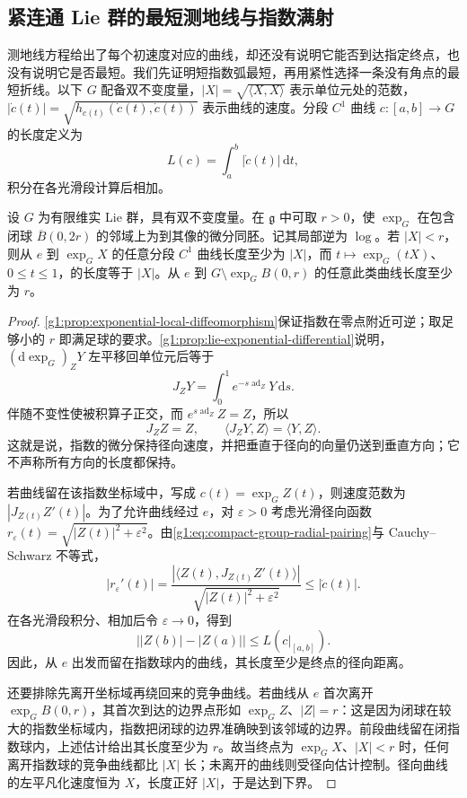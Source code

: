 \subsection{紧连通 Lie 群的最短测地线与指数满射}
\label{g1:subsec:1901:04}
测地线方程给出了每个初速度对应的曲线，却还没有说明它能否到达指定终点，也没有说明它是否最短。我们先证明短指数弧最短，再用紧性选择一条没有角点的最短折线。以下 \(G\) 配备双不变度量，\(|X|=\sqrt{\langle X,X\rangle}\) 表示单位元处的范数，\(|\dot c(t)|=\sqrt{h_{c(t)}(\dot c(t),\dot c(t))}\) 表示曲线的速度。分段 \(C^1\) 曲线 \(c:[a,b]\to G\) 的长度定义为
\[
	L(c)=\int_a^b|\dot c(t)|\,\mathrm{d}t,
\]
积分在各光滑段计算后相加。

\begin{lemma}\label{g1:lem:compact-group-radial-estimate}
	设 \(G\) 为有限维实 Lie 群，具有双不变度量。在 \(\mathfrak g\) 中可取 \(r>0\)，使 \(\exp_G\) 在包含闭球 \(\overline B(0,2r)\) 的邻域上为到其像的微分同胚。记其局部逆为 \(\log\)。若 \(|X|<r\)，则从 \(e\) 到 \(\exp_GX\) 的任意分段 \(C^1\) 曲线长度至少为 \(|X|\)，而 \(t\mapsto\exp_G(tX)\)、\(0\le t\le1\)，的长度等于 \(|X|\)。从 \(e\) 到 \(G\setminus\exp_GB(0,r)\) 的任意此类曲线长度至少为 \(r\)。
\end{lemma}
\begin{proof}
	\cref{g1:prop:exponential-local-diffeomorphism}保证指数在零点附近可逆；取足够小的 \(r\) 即满足球的要求。\cref{g1:prop:lie-exponential-differential}说明，\((\mathrm{d}\exp_G)_ZY\) 左平移回单位元后等于
	\[
		J_ZY=\int_0^1e^{-s\operatorname{ad}_Z}Y\,\mathrm{d}s.
	\]
	伴随不变性使被积算子正交，而 \(e^{s\operatorname{ad}_Z}Z=Z\)，所以
	\begin{equation}\label{g1:eq:compact-group-radial-pairing}
		J_ZZ=Z,\qquad \langle J_ZY,Z\rangle=\langle Y,Z\rangle.
	\end{equation}
	这就是说，指数的微分保持径向速度，并把垂直于径向的向量仍送到垂直方向；它不声称所有方向的长度都保持。

	若曲线留在该指数坐标域中，写成 \(c(t)=\exp_GZ(t)\)，则速度范数为 \(|J_{Z(t)}Z'(t)|\)。为了允许曲线经过 \(e\)，对 \(\varepsilon>0\) 考虑光滑径向函数 \(r_\varepsilon(t)=\sqrt{|Z(t)|^2+\varepsilon^2}\)。由\eqref{g1:eq:compact-group-radial-pairing}与 Cauchy--Schwarz 不等式，
	\[
		|r_\varepsilon'(t)|
		=\frac{|\langle Z(t),J_{Z(t)}Z'(t)\rangle|}
		{\sqrt{|Z(t)|^2+\varepsilon^2}}
		\le |\dot c(t)|.
	\]
	在各光滑段积分、相加后令 \(\varepsilon\to0\)，得到
	\[
		\bigl||Z(b)|-|Z(a)|\bigr|\le L(c|_{[a,b]}).
	\]
	因此，从 \(e\) 出发而留在指数球内的曲线，其长度至少是终点的径向距离。

	还要排除先离开坐标域再绕回来的竞争曲线。若曲线从 \(e\) 首次离开 \(\exp_GB(0,r)\)，其首次到达的边界点形如 \(\exp_GZ\)、\(|Z|=r\)：这是因为闭球在较大的指数坐标域内，指数把闭球的边界准确映到该邻域的边界。前段曲线留在闭指数球内，上述估计给出其长度至少为 \(r\)。故当终点为 \(\exp_GX\)、\(|X|<r\) 时，任何离开指数球的竞争曲线都比 \(|X|\) 长；未离开的曲线则受径向估计控制。径向曲线的左平凡化速度恒为 \(X\)，长度正好 \(|X|\)，于是达到下界。
\end{proof}

